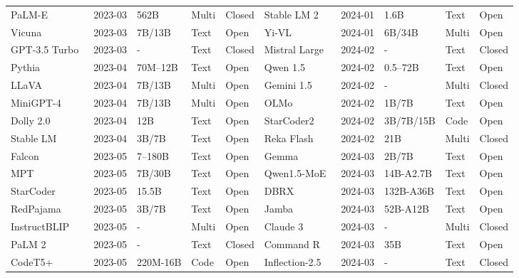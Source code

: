 \begin{table}[htbp]
{\begin{tabular}{@{} lllll | lllll @{}}
PaLM-E~\cite{driess2023palme} & 2023-03 & 562B & Multi & Closed & Stable LM 2~\cite{bellagente2024stable} & 2024-01 & 1.6B & Text & Open \\
Vicuna~\cite{vicuna2023lmsys} & 2023-03 & 7B/13B & Text & Open & Yi-VL~\cite{young2024yi} & 2024-01 & 6B/34B & Multi & Open \\
GPT-3.5 Turbo~\cite{openai2023gpt35turboapi} & 2023-03 & - & Text & Closed & Mistral Large~\cite{mistral2024large} & 2024-02 & - & Text & Closed \\
Pythia~\cite{biderman2023pythia} & 2023-04 & 70M--12B & Text & Open & Qwen 1.5~\cite{qwen2024qwen15moe} & 2024-02 & 0.5--72B & Text & Open \\
LLaVA~\cite{liu2023llava} & 2023-04 & 7B/13B & Multi & Open & Gemini 1.5~\cite{gemini2024gemini15} & 2024-02 & - & Multi & Closed \\
MiniGPT-4~\cite{zhu2023minigpt4} & 2023-04 & 7B/13B & Multi & Open & OLMo~\cite{groeneveld2024olmo} & 2024-02 & 1B/7B & Text & Open \\
Dolly 2.0~\cite{databricks2023dolly15k} & 2023-04 & 12B & Text & Open & StarCoder2~\cite{lozhkov2024starcoder} & 2024-02 & 3B/7B/15B & Code & Open \\
Stable LM~\cite{stabilityai2023stablelm} & 2023-04 & 3B/7B & Text & Open & Reka Flash~\cite{rekaai2024rekaflash} & 2024-02 & 21B & Multi & Closed \\
Falcon~\cite{almazrouei2023falcon,penedo2023refinedweb} & 2023-05 & 7--180B & Text & Open & Gemma~\cite{gemma2024} & 2024-03 & 2B/7B & Text & Open \\
MPT~\cite{mosaicml2023mpt7b,mosaicml2023mpt30b} & 2023-05 & 7B/30B & Text & Open & Qwen1.5-MoE~\cite{qwen2024qwen15moe} & 2024-03 & 14B-A2.7B & Text & Open \\
StarCoder~\cite{li2023starcoder} & 2023-05 & 15.5B & Text & Open & DBRX~\cite{databricks2024dbrx} & 2024-03 & 132B-A36B & Text & Open \\
RedPajama~\cite{together2023redpajama} & 2023-05 & 3B/7B & Text & Open & Jamba~\cite{lieber2024jamba} & 2024-03 & 52B-A12B & Text & Open \\
InstructBLIP~\cite{dai2023instructblip} & 2023-05 & - & Multi & Open & Claude 3~\cite{anthropic2024claude3} & 2024-03 & - & Multi & Closed \\
PaLM 2~\cite{anil2023palm} & 2023-05 & - & Text & Closed & Command R~\cite{cohere2024commandr} & 2024-03 & 35B & Text & Open \\
CodeT5+~\cite{wang2023codet5+} & 2023-05 & 220M-16B & Code & Open & Inflection-2.5~\cite{inflection2024inflection25} & 2024-03 & - & Text & Closed \\

\end{tabular}}
\end{table}
